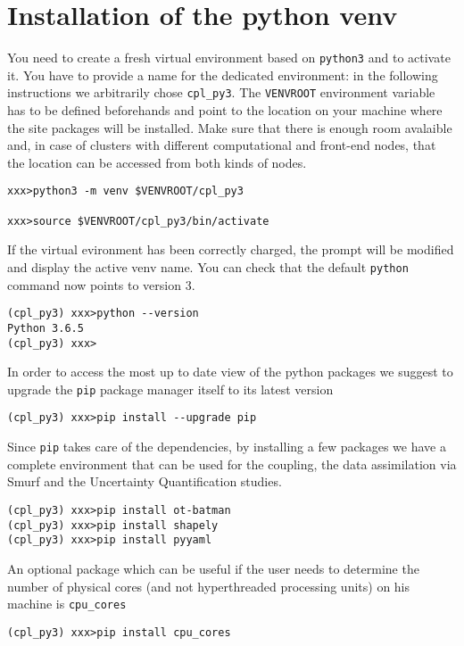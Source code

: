 \chapter{Installation of the python venv}\label{ann:venv_install}

  You need to create a fresh virtual environment based on
  \texttt{python3} and to activate it.
  You have to provide a name for the dedicated
environment: in the following instructions we arbitrarily chose
\texttt{cpl\_py3}. The \texttt{VENVROOT} environment variable has to
be defined beforehands and point to the location on your machine where
the site packages will be installed. Make sure that there is enough
room avalaible and, in case of clusters with different
computational and front-end nodes, that the location can be accessed
from both kinds of nodes.
\begin{verbatim}
xxx>python3 -m venv $VENVROOT/cpl_py3

xxx>source $VENVROOT/cpl_py3/bin/activate
\end{verbatim}

If the virtual evironment has been correctly charged, the prompt will
be modified and display the active venv name. You can check that the
default \texttt{python} command now points to version 3.
\begin{verbatim}
(cpl_py3) xxx>python --version
Python 3.6.5
(cpl_py3) xxx>
\end{verbatim}

In order to access the most up to date view of the python packages we
suggest to upgrade the \texttt{pip} package manager itself to its latest
version
\begin{verbatim}
(cpl_py3) xxx>pip install --upgrade pip
\end{verbatim}

Since \texttt{pip} takes care of the dependencies, by installing a few
packages we have a complete environment that can be used for the
coupling, the data assimilation via Smurf and the Uncertainty
Quantification studies.
\begin{verbatim}
(cpl_py3) xxx>pip install ot-batman
(cpl_py3) xxx>pip install shapely
(cpl_py3) xxx>pip install pyyaml
\end{verbatim}

An optional package which can be useful if the user needs to determine
the number of physical cores (and not hyperthreaded processing units)
on his machine is \texttt{cpu\_cores}
\begin{verbatim}
(cpl_py3) xxx>pip install cpu_cores
\end{verbatim}

